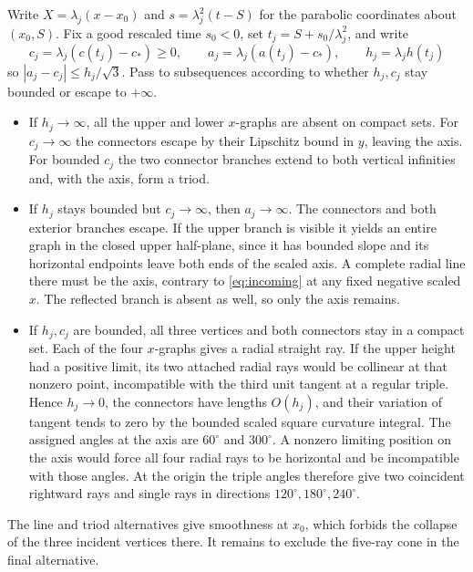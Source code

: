 Write \(X=\lambda_j(x-x_0)\) and \(s=\lambda_j^2(t-S)\) for
the parabolic coordinates about \((x_0,S)\). Fix a good rescaled time
\(s_0<0\), set \(t_j=S+s_0/\lambda_j^2\), and write
\[
 c_j=\lambda_j(c(t_j)-c_*)\ge0,\qquad
 a_j=\lambda_j(a(t_j)-c_*),\qquad h_j=\lambda_j h(t_j)
\]
so \(|a_j-c_j|\le h_j/\sqrt3\).
Pass to subsequences according to whether \(h_j,c_j\) stay bounded
or escape to \(+\infty\).
\begin{itemize}
\item If \(h_j\to\infty\), all the upper and lower \(x\)-graphs are
  absent on compact sets. For \(c_j\to\infty\) the connectors escape
  by their Lipschitz bound in \(y\), leaving the axis. For bounded \(c_j\)
  the two connector branches extend to both vertical infinities and,
  with the axis, form a triod.
\item If \(h_j\) stays bounded but \(c_j\to\infty\), then \(a_j\to\infty\).
  The connectors and both exterior branches escape. If the upper
  branch is visible it yields an entire graph in the closed upper
  half-plane, since it has bounded slope and its horizontal endpoints
  leave both ends of the scaled axis. A complete radial line there
  must be the axis, contrary to \eqref{eq:incoming} at any fixed
  negative scaled \(x\). The reflected branch is absent as well,
  so only the axis remains.
\item If \(h_j,c_j\) are bounded, all three vertices and both
  connectors stay in a compact set. Each of the four \(x\)-graphs
  gives a radial straight ray. If the upper height had a positive
  limit, its two attached radial rays would be collinear at that
  nonzero point, incompatible with the third unit tangent at a
  regular triple. Hence \(h_j\to0\), the connectors have lengths
  \(O(h_j)\), and their variation of tangent tends to zero by the
  bounded scaled square curvature integral. The assigned angles at
  the axis are \(60^\circ\) and \(300^\circ\).
  A nonzero limiting position on the axis would force all four radial
  rays to be horizontal and be incompatible with those angles. At
  the origin the triple angles therefore give two coincident rightward
  rays and single rays in directions \(120^\circ,180^\circ,240^\circ\).
\end{itemize}
The line and triod alternatives give smoothness at \(x_0\), which
forbids the collapse of the three incident vertices there.
It remains to exclude the five-ray cone in the final alternative.

